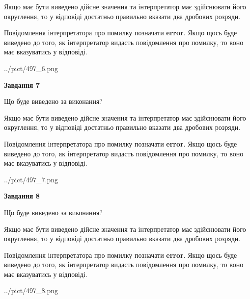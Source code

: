 \documentclass[12pt, ukrainian]{article}
\begin{document}
{\begin {Large}
Якщо має бути виведено дійсне значення та інтерпретатор має здійснювати його округлення, 
то у відповіді достатньо правильно вказати два дробових розряди.

Повідомлення інтерпретатора про помилку позначати \textbf{error}.
Якщо щось буде виведено до того, як інтерпретатор видасть повідомлення про помилку, 
то воно має вказуватись у відповіді. \par

\begin{center}
	{../pict/497_6.png}
\end{center}
\newpage

{\begin {center}\textbf{Завдання 7}\end {center}}\par
Що буде виведено за виконання? \par

Якщо має бути виведено дійсне значення та інтерпретатор має здійснювати його округлення, 
то у відповіді достатньо правильно вказати два дробових розряди.

Повідомлення інтерпретатора про помилку позначати \textbf{error}.
Якщо щось буде виведено до того, як інтерпретатор видасть повідомлення про помилку, 
то воно має вказуватись у відповіді. \par

\begin{center}
	{../pict/497_7.png}
\end{center}
\newpage

{\begin {center}\textbf{Завдання 8}\end {center}}\par
Що буде виведено за виконання? \par

Якщо має бути виведено дійсне значення та інтерпретатор має здійснювати його округлення, 
то у відповіді достатньо правильно вказати два дробових розряди.

Повідомлення інтерпретатора про помилку позначати \textbf{error}.
Якщо щось буде виведено до того, як інтерпретатор видасть повідомлення про помилку, 
то воно має вказуватись у відповіді. \par

\begin{center}
	{../pict/497_8.png}
\end{center}
\newpage


\end{Large}}
\end{document}
